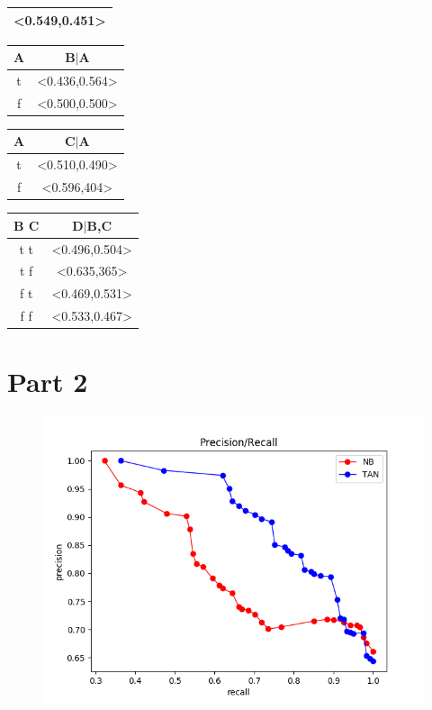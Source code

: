 \documentclass{article}
\newenvironment{soln}{
	\leavevmode\color{red}\ignorespaces
}{}
\begin{document}
\begin{enumerate}
\begin{enumerate}
\begin{soln}
\begin{tabular}{|c|}
\textless{}0.549,0.451\textgreater{} \\ \hline
\end{tabular}
\begin{tabular}{|c|c|}
\hline
A & B$|$A                                  \\ \hline
t & \textless{}0.436,0.564\textgreater{} \\ 
f & \textless{}0.500,0.500\textgreater{} \\ \hline
\end{tabular}
\begin{tabular}{|c|c|}
\hline
A & C$|$A                                  \\ \hline
t & \textless{}0.510,0.490\textgreater{} \\ 
f & \textless{}0.596,404\textgreater{} \\ \hline
\end{tabular}
\begin{tabular}{|c|c|}
\hline
B    C   & D$|$B,C                              \\ \hline
t      t & \textless{}0.496,0.504\textgreater{} \\ 
t      f & \textless{}0.635,365\textgreater{} \\ 
f      t & \textless{}0.469,0.531\textgreater{} \\ 
f      f & \textless{}0.533,0.467\textgreater{} \\  \hline
\end{tabular}
\end{soln}

\section*{Part 2}
\begin{soln}

\begin{figure}[h]
\centering
\includegraphics[scale=1]{../pr}
\label{fig:pr}
\end{figure}



\end{soln}
\end{enumerate}
\end{enumerate}
\end{document}
